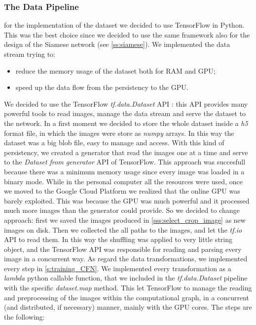 \subsubsection{The Data Pipeline}
for the implementation of the dataset we decided to use TensorFlow in Python. This was the best choice since we decided to use the same framework also for the design of the Siamese network (see \ref{ss:siamese}). We implemented the data stream trying to:
\begin{itemize}
    \item reduce the memory usage of the dataset both for RAM and GPU;
    \item speed up the data flow from the persistency to the GPU.
\end{itemize}
We decided to use the TensorFlow \emph{tf.data.Dataset} API \cite{tf_data_dataset}: this API provides many powerful tools to read images, manage the data stream and serve the dataset to the network.
In a first moment we decided to store the whole dataset inside a \emph{h5} format file, in which the images were store as \emph{numpy} arrays. In this way the dataset was a big blob file, easy to manage and access. With this kind of persistency, we created a generator that read the images one at a time and serve to the \emph{Dataset from generator} API of TensorFlow. This approach was succesfull because there was a minimum memory usage since every image was loaded in a binary mode. While in the personal computer all the resources were used, once we moved to the Google Cloud Platform we realized that the online GPU was barely exploited. This was because the GPU was much powerful and it processed much more images than the generator could provide. 
So we decided to change approach: first we saved the images produced in \ref{sss:select_crop_image} as new images on disk. Then we collected the all paths to the images, and let the \emph{tf.io} API to read them. In this way the shuffling was applied to very little string object, and the TensorFlow API was responsible for reading and parsing every image in a concurrent way.\newline
As regard the data transformations, we implemented every step in \ref{s:training_CFN}. We implemented every transformation as a \emph{lambda} python callable function, that we included in the \emph{tf.data.Dataset} pipeline with the specific \emph{dataset.map} method. This let TensorFlow to manage the reading and preprocessing of the images within the computational graph, in a concurrent (and distributed, if necessary) manner, mainly with the GPU cores. The steps are the following:
